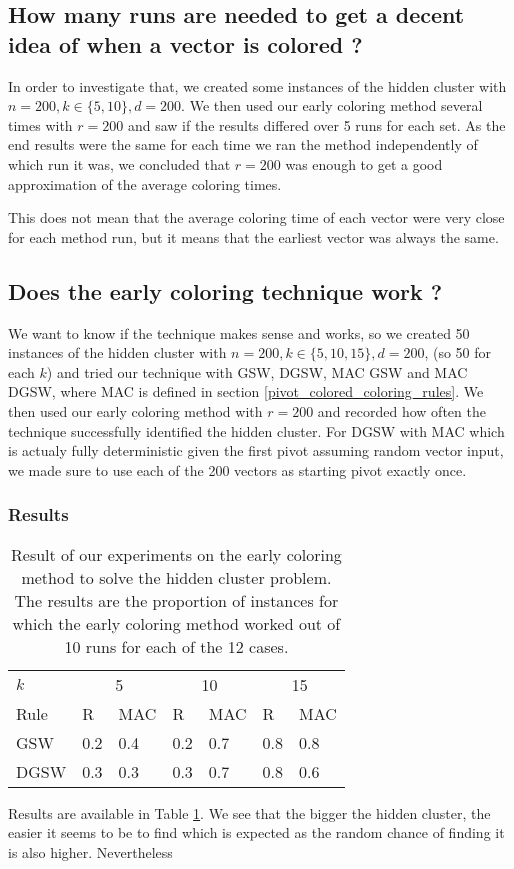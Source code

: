 \documentclass[12pt]{article}
\begin{document}
\subsection{How many runs are needed to get a decent idea of when a vector is colored ?}
In order to investigate that, we created some instances of the hidden cluster with $n=200,k\in\{5,10\},d=200$. We then used our early coloring method several times with $r=200$ and saw if the results differed over 5 runs for each set. As the end results were the same for each time we ran the method independently of which run it was, we concluded that $r=200$ was enough to get a good approximation of the average coloring times. 

This does not mean that the average coloring time of each vector were very close for each method run, but it means that the earliest vector was always the same.

\subsection{Does the early coloring technique work ?}
We want to know if the technique makes sense and works, so we created 50 instances of the hidden cluster with $n=200,k\in\{5,10,15\},d=200$, (so 50 for each $k$) and tried our technique with GSW, DGSW, MAC GSW and MAC DGSW, where MAC is defined in section \ref{pivot_colored_coloring_rules}. We then used our early coloring method with $r=200$ and recorded how often the technique successfully identified the hidden cluster. For DGSW with MAC which is actualy fully deterministic given the first pivot assuming random vector input, we made sure to use each of the 200 vectors as starting pivot exactly once.
\subsubsection{Results}
\begin{center}
\begin{table}[h]
\begin{tabular}{l|ll|ll|ll}
$k$  & \multicolumn{2}{c}{5} & \multicolumn{2}{c}{10} & \multicolumn{2}{c}{15}\\
Rule &R&MAC&R&MAC&R&MAC\\ \hline
GSW  &0.2&0.4&0.2&0.7&0.8&0.8\\
DGSW &0.3&0.3&0.3&0.7&0.8&0.6\\
\end{tabular}
\caption{Result of our experiments on the early coloring method to solve the hidden cluster problem. The results are the proportion of instances for which the early coloring method worked out of 10 runs for each of the 12 cases.}
\label{early_coloring_method_exp1}
\end{table}
\end{center}
Results are available in Table \ref{early_coloring_method_exp1}. We see that the bigger the hidden cluster, the easier it seems to be to find which is expected as the random chance of finding it is also higher. Nevertheless
\end{document}
